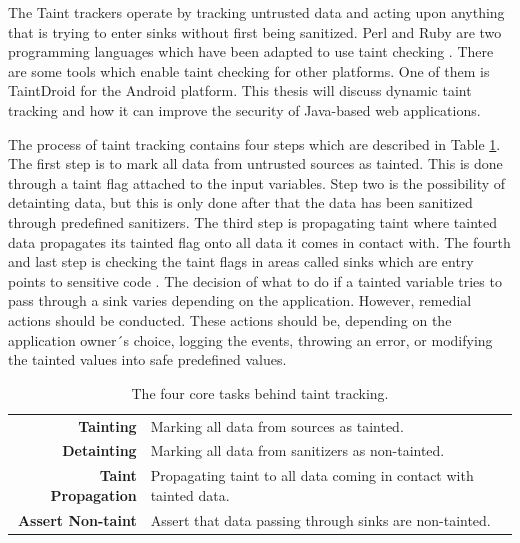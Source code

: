 The Taint trackers operate by tracking untrusted data and acting upon anything that is trying to enter sinks without first being sanitized. Perl and Ruby are two programming languages which have been adapted to use taint checking \parencite{perl, ruby}. There are some tools which enable taint checking for other platforms. One of them is TaintDroid \parencite{Ma2010} for the Android platform. This thesis will discuss dynamic taint tracking and how it can improve the security of Java-based web applications.

The process of taint tracking contains four steps which are described in Table \ref{table:taintTracking}. The first step is to mark all data from untrusted sources as tainted. This is done through a taint flag attached to the input variables. Step two is the possibility of detainting data, but this is only done after that the data has been sanitized through predefined sanitizers. The third step is propagating taint where tainted data propagates its tainted flag onto all data it comes in contact with. The fourth and last step is checking the taint flags in areas called sinks which are entry points to sensitive code \parencite{Pan2015, Venkataramani2008}. The decision of what to do if a tainted variable tries to pass through a sink varies depending on the application. However, remedial actions should be conducted. These actions should be, depending on the application owner´s choice, logging the events, throwing an error, or modifying the tainted values into safe predefined values. 

\begin{table}[H]
  \centering
  \caption{The four core tasks behind taint tracking.}
  \label{table:taintTracking}
  \begin{tabular}{rp{8.5cm}}
    \textbf{Tainting}           & Marking all data from sources as tainted.                          \\
    \textbf{Detainting}         & Marking all data from sanitizers as non-tainted.                   \\
    \textbf{Taint Propagation}     & Propagating taint to all data coming in contact with tainted data. \\
    \textbf{Assert Non-taint} & Assert that data passing through sinks are non-tainted.           
  \end{tabular}
\end{table}

